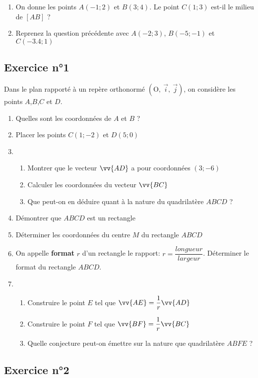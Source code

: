 \documentclass[12pt,a4paper]{article}
\def\Oij{$\left(\text{O},~\vec{i},~\vec{j}\right)$}
\begin{document}
\begin{enumerate}
    \item On donne les points $A(-1;2)$ et $B(3;4)$.
Le point $C(1;3)$ est-il le milieu de $[AB]$ ?
\item Reprenez la question précédente avec $A(-2;3)$, $B(-5;-1)$ et $C(-3.4;1)$
\end{enumerate}



\subsection*{Exercice n°1}

Dans le plan rapporté à un repère orthonormé \Oij{}, on considère les points $A$,$B$,$C$ et $D$.

\begin{center}
\end{center}

\begin{enumerate}
    \item Quelles sont les coordonnées de $A$ et $B$ ?
    \item Placer les points $C(1;-2)$ et $D(5;0)$
    \item 
    \begin{enumerate}
        \item Montrer que le vecteur $\vv{AD}$ a pour coordonnées $(3;-6)$
        \item Calculer les coordonnées du vecteur $\vv{BC}$
        \item Que peut-on en déduire quant à la nature du quadrilatère $ABCD$ ?
    \end{enumerate}
    \item Démontrer que $ABCD$ est un rectangle
    \item Déterminer les coordonnées du centre $M$ du rectangle $ABCD$
    \item On appelle \textbf{format} $r$ d'un rectangle le rapport: $r=\dfrac{longueur}{largeur}$. Déterminer le format du rectangle $ABCD$.
    \item 
    \begin{enumerate}
        \item Construire le point $E$ tel que $\vv{AE}=\dfrac{1}{r}\vv{AD}$
        \item Construire le point $F$ tel que $\vv{BF}=\dfrac{1}{r}\vv{BC}$
        \item Quelle conjecture peut-on émettre sur la nature que quadrilatère $ABFE$ ?
    \end{enumerate}
\end{enumerate}

\subsection*{Exercice n°2}
\end{document}
